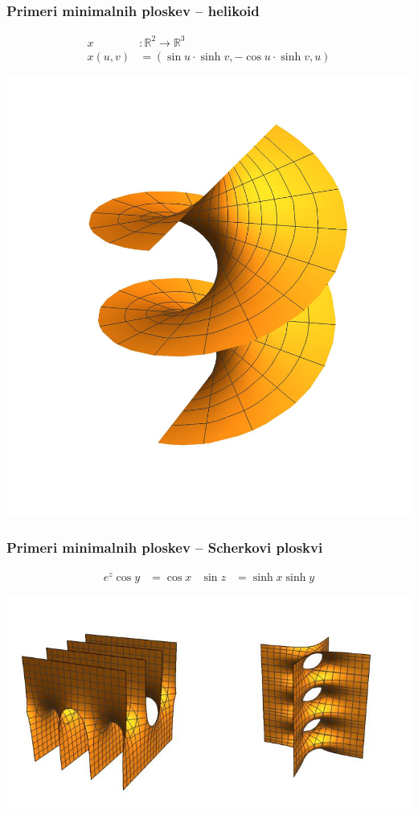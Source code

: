 \documentclass[9pt, table]{beamer}
\newcommand{\R}{\mathbb R}
\begin{document}
\begin{frame}
\frametitle{Primeri minimalnih ploskev -- helikoid}

\begin{align*}
x &\colon \R^{2} \to \R^{3} \\
x(u,v) &= (\sin u \cdot \sinh v, -\cos u \cdot \sinh v, u)
\end{align*}
%
\begin{center}
\includegraphics[scale=0.4]{helikoid.jpg}
\end{center}

\end{frame}


\begin{frame}
\frametitle{Primeri minimalnih ploskev -- Scherkovi ploskvi}

\begin{align*}
e^{z} \cos y &= \cos x & \sin z &= \sinh x \sinh y
\end{align*}

\includegraphics[scale=0.8]{scherk.jpg}

\end{frame}

\end{document}
